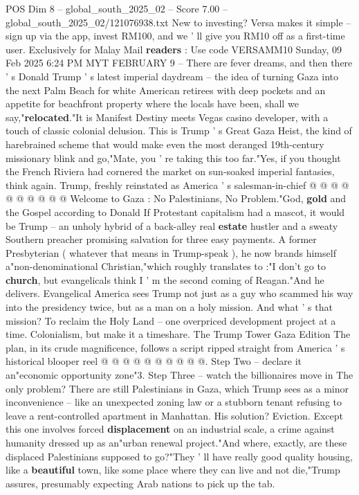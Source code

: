\begin{textsample}{POS Dim 8 – global\_south\_2025\_02 – Score 7.00 – global\_south\_2025\_02/121076938.txt}  \label{ex:f8_pos_075}
New to investing?
Versa makes it simple -- sign up via the app, invest RM100, and we ' ll give you RM10 off as a first-time user.
Exclusively for Malay Mail \textbf{readers} : Use code VERSAMM10 Sunday, 09 Feb 2025 6:24 PM MYT FEBRUARY 9 -- There are fever dreams, and then there ' s Donald Trump ' s latest imperial daydream -- the idea of turning Gaza into the next Palm Beach for white American retirees with deep pockets and an appetite for beachfront property where the locals have been, shall we say,"\textbf{relocated}."It is Manifest Destiny meets Vegas casino developer, with a touch of classic colonial delusion.
This is Trump ' s Great Gaza Heist, the kind of harebrained scheme that would make even the most deranged 19th-century missionary blink and go,"Mate, you ' re taking this too far."Yes, if you thought the French Riviera had cornered the market on sun-soaked imperial fantasies, think again.
Trump, freshly reinstated as America ' s salesman-in-chief @ @ @ @ @ @ @ @ @ @ Welcome to Gaza : No Palestinians, No Problem."God, \textbf{gold} and the Gospel according to Donald If Protestant capitalism had a mascot, it would be Trump -- an unholy hybrid of a back-alley real \textbf{estate} hustler and a sweaty Southern preacher promising salvation for three easy payments.
A former Presbyterian ( whatever that means in Trump-speak ), he now brands himself a"non-denominational Christian,"which roughly translates to :"I don't go to \textbf{church}, but evangelicals think I ' m the second coming of Reagan."And he delivers.
Evangelical America sees Trump not just as a guy who scammed his way into the presidency twice, but as a man on a holy mission.
And what ' s that mission?
To reclaim the Holy Land -- one overpriced development project at a time.
Colonialism, but make it a timeshare.
The Trump Tower Gaza Edition The plan, in its crude magnificence, follows a script ripped straight from America ' s historical blooper reel @ @ @ @ @ @ @ @ @ @.
Step Two -- declare it an"economic opportunity zone"3.
Step Three -- watch the billionaires move in The only problem?
There are still Palestinians in Gaza, which Trump sees as a minor inconvenience -- like an unexpected zoning law or a stubborn tenant refusing to leave a rent-controlled apartment in Manhattan.
His solution?
Eviction.
Except this one involves forced \textbf{displacement} on an industrial scale, a crime against humanity dressed up as an"urban renewal project."And where, exactly, are these displaced Palestinians supposed to go?"They ' ll have really good quality housing, like a \textbf{beautiful} town, like some place where they can live and not die,"Trump assures, presumably expecting Arab nations to pick up the tab.

\end{textsample}
